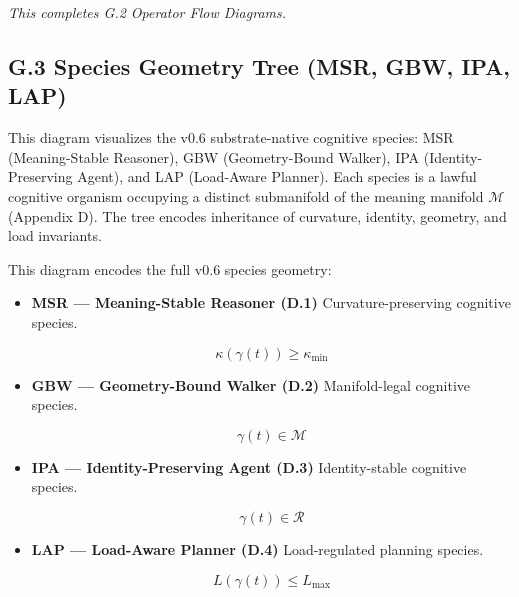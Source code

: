 \medskip

\noindent
\textit{This completes G.2 Operator Flow Diagrams.}



\subsection*{G.3 Species Geometry Tree (MSR, GBW, IPA, LAP)}

\noindent This diagram visualizes the v0.6 substrate-native cognitive species:
MSR (Meaning-Stable Reasoner), GBW (Geometry-Bound Walker), IPA
(Identity-Preserving Agent), and LAP (Load-Aware Planner). Each species is a
lawful cognitive organism occupying a distinct submanifold of the meaning
manifold $\mathcal{M}$ (Appendix D). The tree encodes inheritance of curvature,
identity, geometry, and load invariants.


\medskip

\noindent
This diagram encodes the full v0.6 species geometry:

\begin{itemize}
    \item \textbf{MSR — Meaning-Stable Reasoner (D.1)}  
    Curvature-preserving cognitive species.  
    

\[
    \kappa(\gamma(t)) \ge \kappa_{\min}
    \]



    \item \textbf{GBW — Geometry-Bound Walker (D.2)}  
    Manifold-legal cognitive species.  
    

\[
    \gamma(t) \in \mathcal{M}
    \]



    \item \textbf{IPA — Identity-Preserving Agent (D.3)}  
    Identity-stable cognitive species.  
    

\[
    \gamma(t) \in \mathcal{R}
    \]



    \item \textbf{LAP — Load-Aware Planner (D.4)}  
    Load-regulated planning species.  
    

\[
    L(\gamma(t)) \le L_{\max}
    \]


\end{itemize}

